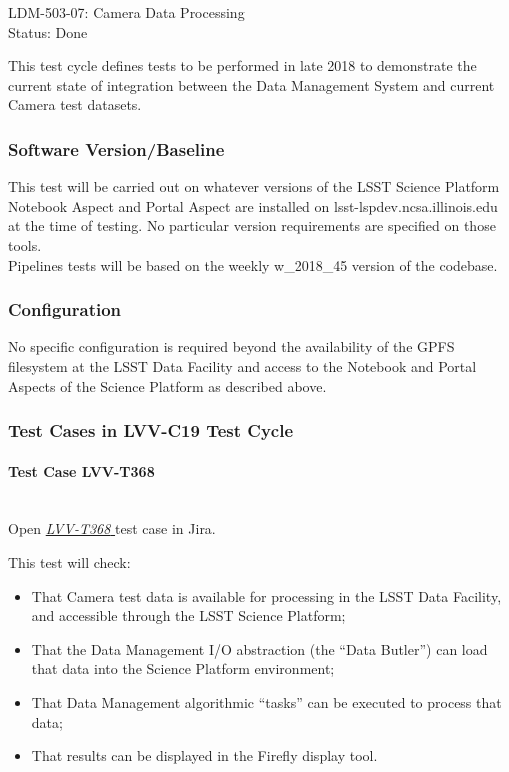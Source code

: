 \documentclass[DM,lsstdraft,STR,toc]{lsstdoc}
\providecommand{\tightlist}{
  \setlength{\itemsep}{0pt}\setlength{\parskip}{0pt}}
\begin{document}
  LDM-503-07: Camera Data Processing\\
  Status: Done

  This test cycle defines tests to be performed in late 2018 to
demonstrate the current state of integration between the Data Management
System and current Camera test datasets.


  \subsubsection{Software Version/Baseline}
    This test will be carried out on whatever versions of the LSST Science
Platform Notebook Aspect and Portal Aspect are installed on
lsst-lspdev.ncsa.illinois.edu at the time of testing. No particular
version requirements are specified on those
tools.\\[2\baselineskip]Pipelines tests will be based on the weekly
w\_2018\_45 version of the codebase.~


  \subsubsection{Configuration}
    No specific configuration is required beyond the availability of the
GPFS filesystem at the LSST Data Facility and access to the Notebook and
Portal Aspects of the Science Platform as described above.


  \subsubsection{Test Cases in LVV-C19 Test Cycle}


    \paragraph{Test Case LVV-T368 }\mbox{}\\

Open  \href{https://jira.lsstcorp.org/secure/Tests.jspa#/testCase/LVV-T368}{\textit{ LVV-T368 } }
test case in Jira.

    This test will check:

\begin{itemize}
\tightlist
\item
  That Camera test data is available for processing in the LSST Data
  Facility, and accessible through the LSST Science Platform;
\item
  That the Data Management I/O abstraction (the ``Data Butler'') can
  load that data into the Science Platform environment;
\item
  That Data Management algorithmic ``tasks'' can be executed to process
  that data;
\item
  That results can be displayed in the Firefly display tool.
\end{itemize}
\end{document}
